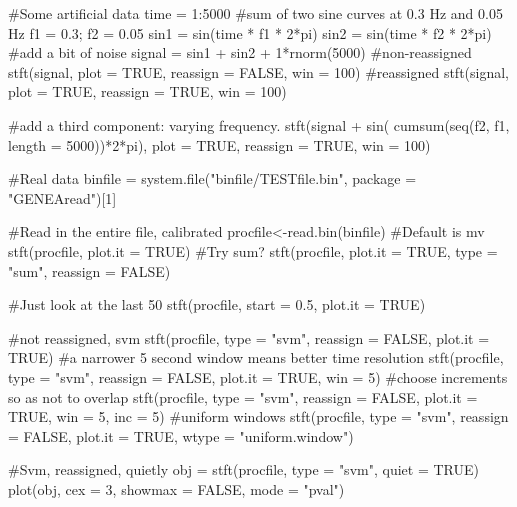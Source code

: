 \documentclass[a4paper]{book}
\begin{document}
\begin{Examples}
\begin{ExampleCode}
#Some artificial data
time = 1:5000
#sum of two sine curves at 0.3 Hz and 0.05 Hz
f1 = 0.3; f2 = 0.05
sin1 = sin(time * f1 * 2*pi)
sin2 = sin(time * f2 * 2*pi)
#add a bit of noise
signal = sin1 + sin2 + 1*rnorm(5000)
#non-reassigned
stft(signal, plot = TRUE, reassign = FALSE, win = 100)
#reassigned
stft(signal, plot = TRUE, reassign = TRUE, win = 100)

#add a third component: varying frequency.
stft(signal + sin( cumsum(seq(f2, f1, length = 5000))*2*pi), plot = TRUE, reassign = TRUE, win = 100)

#Real data
binfile  = system.file("binfile/TESTfile.bin", package = "GENEAread")[1]

#Read in the entire file, calibrated
procfile<-read.bin(binfile)
#Default is mv
stft(procfile, plot.it = TRUE)
#Try sum?
stft(procfile, plot.it = TRUE, type = "sum", reassign = FALSE)

#Just look at the last 50%
stft(procfile, start = 0.5, plot.it = TRUE)

#not reassigned, svm
stft(procfile, type = "svm", reassign = FALSE, plot.it = TRUE)
#a narrower 5 second window means better time resolution
stft(procfile, type = "svm", reassign = FALSE, plot.it = TRUE, win = 5)
#choose increments so as not to overlap
stft(procfile, type = "svm", reassign = FALSE, plot.it = TRUE, win = 5, inc = 5)
#uniform windows
stft(procfile, type = "svm", reassign = FALSE, plot.it = TRUE, wtype = "uniform.window")

#Svm, reassigned, quietly
obj = stft(procfile, type = "svm", quiet = TRUE)
plot(obj, cex = 3, showmax = FALSE, mode = "pval")
\end{ExampleCode}
\end{Examples}
\printindex{}
\end{document}
